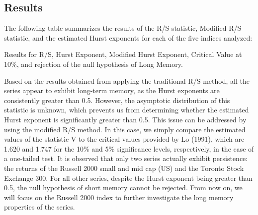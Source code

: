 \documentclass[11pt]{extarticle}
\begin{document}
\subsection{Results}

The following table summarizes the results of the R/S statistic, Modified R/S statistic, and the estimated Hurst exponents for each of the five indices analyzed: \\

\begin{table}[h!]
    \centering
    \caption{Results for R/S, Hurst Exponent, Modified Hurst Exponent, Critical Value at 10\%, and rejection of the null
    hypothesis of Long Memory.}
    \label{tab:hurst_results}
\end{table}

\FloatBarrier


Based on the results obtained from applying the traditional R/S method, all the series appear to exhibit long-term memory,
as the Hurst exponents are consistently greater than 0.5. However, the asymptotic distribution of this statistic is unknown,
which prevents us from determining whether the estimated Hurst exponent is significantly greater than 0.5. This issue can be
addressed by using the modified R/S method. In this case, we simply compare the estimated values of the statistic V to the
critical values provided by Lo (1991), which are 1.620 and 1.747 for the 10\% and 5\% significance levels, respectively,
in the case of a one-tailed test. It is observed that only two series actually exhibit persistence: the returns of the
Russell 2000 small and mid cap (US) and the Toronto Stock Exchange 300.
For all other series, despite the Hurst exponent being greater than 0.5, the null hypothesis
of short memory cannot be rejected.
From now on, we will focus on the Russell 2000 index to further investigate the long memory properties of the series.
\end{document}
